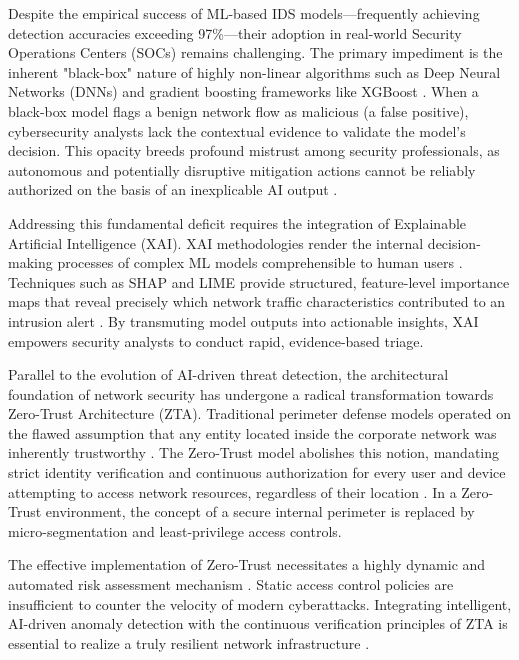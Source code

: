 \documentclass[conference]{IEEEtran}
\begin{document}
Despite the empirical success of ML-based IDS models—frequently achieving detection accuracies exceeding 97\%—their adoption in real-world Security Operations Centers (SOCs) remains challenging. The primary impediment is the inherent "black-box" nature of highly non-linear algorithms such as Deep Neural Networks (DNNs) and gradient boosting frameworks like XGBoost \cite{sharafaldin2018toward}. When a black-box model flags a benign network flow as malicious (a false positive), cybersecurity analysts lack the contextual evidence to validate the model's decision. This opacity breeds profound mistrust among security professionals, as autonomous and potentially disruptive mitigation actions cannot be reliably authorized on the basis of an inexplicable AI output \cite{moustafa2015unsw}.

Addressing this fundamental deficit requires the integration of Explainable Artificial Intelligence (XAI). XAI methodologies render the internal decision-making processes of complex ML models comprehensible to human users \cite{mahbooba2021explainable, alotaibi2023adaptive}. Techniques such as SHAP and LIME provide structured, feature-level importance maps that reveal precisely which network traffic characteristics contributed to an intrusion alert \cite{chen2016xgboost, ke2017lightgbm}. By transmuting model outputs into actionable insights, XAI empowers security analysts to conduct rapid, evidence-based triage.

Parallel to the evolution of AI-driven threat detection, the architectural foundation of network security has undergone a radical transformation towards Zero-Trust Architecture (ZTA). Traditional perimeter defense models operated on the flawed assumption that any entity located inside the corporate network was inherently trustworthy \cite{ahmad2020network}. The Zero-Trust model abolishes this notion, mandating strict identity verification and continuous authorization for every user and device attempting to access network resources, regardless of their location \cite{wang2021explainable}. In a Zero-Trust environment, the concept of a secure internal perimeter is replaced by micro-segmentation and least-privilege access controls. 

The effective implementation of Zero-Trust necessitates a highly dynamic and automated risk assessment mechanism \cite{lundberg2017unified}. Static access control policies are insufficient to counter the velocity of modern cyberattacks. Integrating intelligent, AI-driven anomaly detection with the continuous verification principles of ZTA is essential to realize a truly resilient network infrastructure \cite{ribeiro2016should, stafford2020zero}. 
\end{document}
